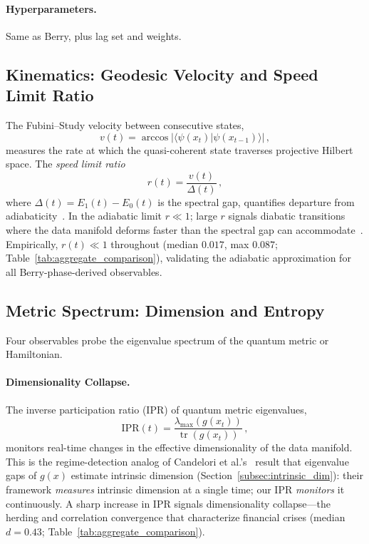 \documentclass[3p]{elsarticle}
\newcommand{\braket}[2]{\langle#1|#2\rangle}
\newcommand{\tr}{\operatorname{tr}}
\begin{document}
\paragraph{Hyperparameters.}  Same as Berry, plus lag set and weights.

\subsection{Kinematics: Geodesic Velocity and Speed Limit Ratio}%
\label{subsec:geodesic_vel}\label{subsec:speed_limit}

The Fubini--Study velocity between consecutive states,
\begin{equation}\label{eq:geodesic_vel}
  v(t) = \arccos\bigl|\braket{\psi(x_t)}{\psi(x_{t-1})}\bigr|\,,
\end{equation}
measures the rate at which the quasi-coherent state traverses
projective Hilbert space.  The \emph{speed limit ratio}
\begin{equation}\label{eq:speed_limit}
  r(t) = \frac{v(t)}{\Delta(t)}\,,
\end{equation}
where $\Delta(t) = E_1(t) - E_0(t)$ is the spectral gap,
quantifies departure from adiabaticity~\cite{kato1966,born_fock1928}.
In the adiabatic limit $r \ll 1$; large $r$ signals diabatic
transitions where the data manifold deforms faster than the spectral
gap can accommodate~\cite{margolus1998}.
Empirically, $r(t) \ll 1$ throughout (median $0.017$, max $0.087$;
Table~\ref{tab:aggregate_comparison}), validating the adiabatic
approximation for all Berry-phase-derived observables.

\subsection{Metric Spectrum: Dimension and Entropy}%
\label{subsec:dim_collapse}\label{subsec:spectral_entropy}%
\label{subsec:spectral_complexity}\label{subsec:eff_state_dim}

Four observables probe the eigenvalue spectrum of the quantum metric
or Hamiltonian.

\paragraph{Dimensionality Collapse.}
The inverse participation ratio (IPR) of quantum metric eigenvalues,
\begin{equation}\label{eq:dim_collapse}
  \mathrm{IPR}(t) = \frac{\lambda_{\max}(g(x_t))}{\tr(g(x_t))}\,,
\end{equation}
monitors real-time changes in the effective dimensionality of the data
manifold.  This is the regime-detection analog of Candelori et
al.'s~\cite{candelori2025} result that eigenvalue gaps of $g(x)$
estimate intrinsic dimension (Section~\ref{subsec:intrinsic_dim}):
their framework \emph{measures} intrinsic dimension at a single time;
our IPR \emph{monitors} it continuously.  A sharp increase in IPR
signals dimensionality collapse---the herding and correlation convergence
that characterize financial crises (median $d = 0.43$;
Table~\ref{tab:aggregate_comparison}).
\end{document}
